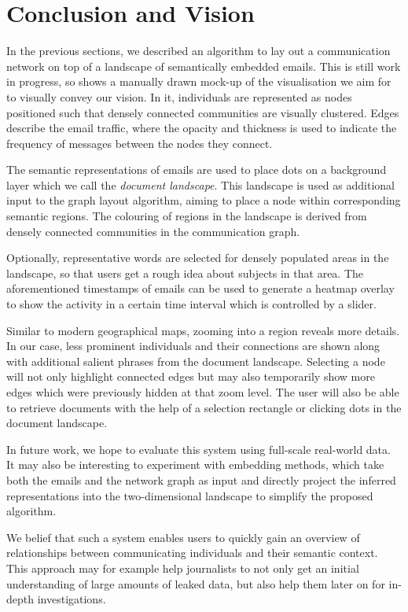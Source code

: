 \section{Conclusion and Vision}
In the previous sections, we described an algorithm to lay out a communication network on top of a landscape of semantically embedded emails.
This is still work in progress, so  shows a manually drawn mock-up of the visualisation we aim for to visually convey our vision.
In it, individuals are represented as nodes positioned such that densely connected communities are visually clustered.
Edges describe the email traffic, where the opacity and thickness is used to indicate the frequency of messages between the nodes they connect.

The semantic representations of emails are used to place dots on a background layer which we call the \textit{document landscape}.
This landscape is used as additional input to the graph layout algorithm, aiming to place a node within corresponding semantic regions.
The colouring of regions in the landscape is derived from densely connected communities in the communication graph.

Optionally, representative words are selected for densely populated areas in the landscape, so that users get a rough idea about subjects in that area.
The aforementioned timestamps of emails can be used to generate a heatmap overlay to show the activity in a certain time interval which is controlled by a slider.

Similar to modern geographical maps, zooming into a region reveals more details.
In our case, less prominent individuals and their connections are shown along with additional salient phrases from the document landscape.
Selecting a node will not only highlight connected edges but may also temporarily show more edges which were previously hidden at that zoom level.
The user will also be able to retrieve documents with the help of a selection rectangle or clicking dots in the document landscape.

In future work, we hope to evaluate this system using full-scale real-world data.
It may also be interesting to experiment with embedding methods, which take both the emails and the network graph as input and directly project the inferred representations into the two-dimensional landscape to simplify the proposed algorithm.

We belief that such a system enables users to quickly gain an overview of relationships between communicating individuals and their semantic context.
This approach may for example help journalists to not only get an initial understanding of large amounts of leaked data, but also help them later on for in-depth investigations.

